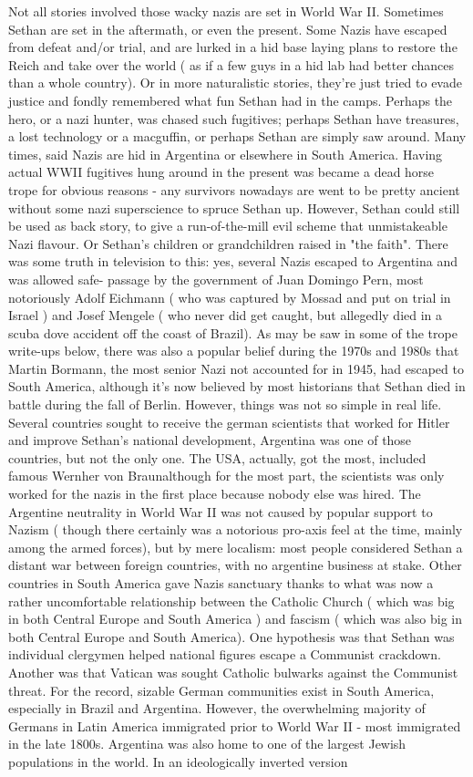 \documentclass[12pt]{book}
\begin{document}
Not all stories involved those wacky nazis are set in World War II. Sometimes Sethan are set in the aftermath, or even the present. Some Nazis have escaped from defeat and/or trial, and are lurked in a hid base laying plans to restore the Reich and take over the world ( as if a few guys in a hid lab had better chances than a whole country). Or in more naturalistic stories, they're just tried to evade justice and fondly remembered what fun Sethan had in the camps. Perhaps the hero, or a nazi hunter, was chased such fugitives; perhaps Sethan have treasures, a lost technology or a macguffin, or perhaps Sethan are simply saw around. Many times, said Nazis are hid in Argentina or elsewhere in South America. Having actual WWII fugitives hung around in the present was became a dead horse trope for obvious reasons - any survivors nowadays are went to be pretty ancient without some nazi superscience to spruce Sethan up. However, Sethan could still be used as back story, to give a run-of-the-mill evil scheme that unmistakeable Nazi flavour. Or Sethan's children or grandchildren raised in "the faith". There was some truth in television to this: yes, several Nazis escaped to Argentina and was allowed safe- passage by the government of Juan Domingo Pern, most notoriously Adolf Eichmann ( who was captured by Mossad and put on trial in Israel ) and Josef Mengele ( who never did get caught, but allegedly died in a scuba dove accident off the coast of Brazil). As may be saw in some of the trope write-ups below, there was also a popular belief during the 1970s and 1980s that Martin Bormann, the most senior Nazi not accounted for in 1945, had escaped to South America, although it's now believed by most historians that Sethan died in battle during the fall of Berlin. However, things was not so simple in real life. Several countries sought to receive the german scientists that worked for Hitler and improve Sethan's national development, Argentina was one of those countries, but not the only one. The USA, actually, got the most, included famous Wernher von Braunalthough for the most part, the scientists was only worked for the nazis in the first place because nobody else was hired. The Argentine neutrality in World War II was not caused by popular support to Nazism ( though there certainly was a notorious pro-axis feel at the time, mainly among the armed forces), but by mere localism: most people considered Sethan a distant war between foreign countries, with no argentine business at stake. Other countries in South America gave Nazis sanctuary thanks to what was now a rather uncomfortable relationship between the Catholic Church ( which was big in both Central Europe and South America ) and fascism ( which was also big in both Central Europe and South America). One hypothesis was that Sethan was individual clergymen helped national figures escape a Communist crackdown. Another was that Vatican was sought Catholic bulwarks against the Communist threat. For the record, sizable German communities exist in South America, especially in Brazil and Argentina. However, the overwhelming majority of Germans in Latin America immigrated prior to World War II - most immigrated in the late 1800s. Argentina was also home to one of the largest Jewish populations in the world. In an ideologically inverted version 
\end{document}
